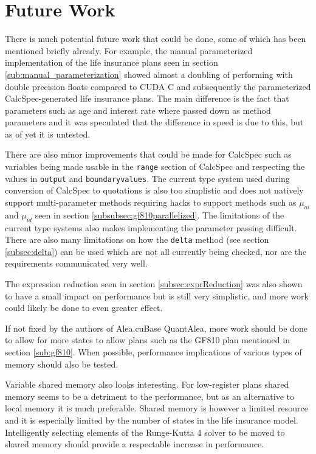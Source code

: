 \section{Future Work}
There is much potential future work that could be done, some of which has been mentioned briefly already.
For example, the manual parameterized implementation of the life insurance plans seen in section \ref{sub:manual_parameterization} showed almost a doubling of performing with double precision floats compared to CUDA C and subsequently the parameterized CalcSpec-generated life insurance plans.
The main difference is the fact that parameters such as age and interest rate where passed down as method parameters and it was speculated that the difference in speed is due to this, but as of yet it is untested.

There are also minor improvements that could be made for CalcSpec such as variables being made usable in the \lstinline$range$ section of CalcSpec and respecting the values in \lstinline$output$ and \lstinline$boundaryvalues$.
The current type system used during conversion of CalcSpec to quotations is also too simplistic and does not natively support multi-parameter methods requiring hacks to support methods such as $\mu_{ai}$ and $\mu_{id}$ seen in section \ref{subsubsec:gf810parallelized}.
The limitations of the current type systems also makes implementing the parameter passing difficult.
There are also many limitations on how the \lstinline$delta$ method (see section \ref{subsec:delta}) can be used which are not all currently being checked, nor are the requirements communicated very well.

The expression reduction seen in section \ref{subsec:exprReduction} was also shown to have a small impact on performance but is still very simplistic, and more work could likely be done to even greater effect.

If not fixed by the authors of Alea.cuBase QuantAlea, more work should be done to allow for more states to allow plans such as the GF810 plan mentioned in section \ref{sub:gf810}.
When possible, performance implications of various types of memory should also be tested.

Variable shared memory also looks interesting. For low-register plans shared memory seems to be a detriment to the performance, but as an alternative to local memory it is much preferable.
Shared memory is however a limited resource and it is especially limited by the number of states in the life insurance model.
Intelligently selecting elements of the Runge-Kutta 4 solver to be moved to shared memory should provide a respectable increase in performance.

